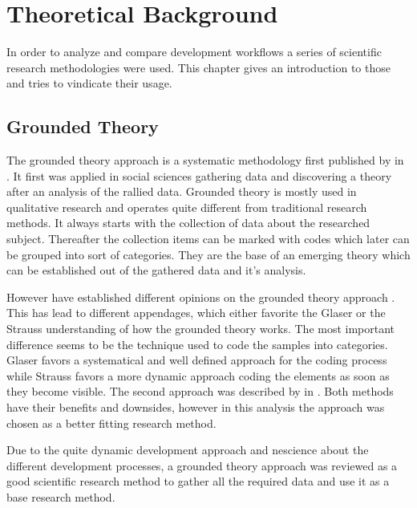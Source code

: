 \chapter{Theoretical Background} %
\label{cha:Theoretical Background}

In order to analyze and compare development workflows a series of scientific
research methodologies were used. This chapter gives an introduction to those
and tries to vindicate their usage.

\section{Grounded Theory} %
\label{sec:Grounded Theory}

The grounded theory approach is a systematic methodology first published by
\textcite{Glaser1967} in \citeyear{Glaser1967}. It first was applied in social
sciences gathering data and discovering a theory after an analysis of the
rallied data. Grounded theory is mostly used in qualitative research and
operates quite different from traditional research methods. It always starts
with the collection of data about the researched subject. Thereafter the
collection items can be marked with codes which later can be grouped into sort
of categories. They are the base of an emerging theory which can be established
out of the gathered data and it's analysis.

However \citeauthor{Glaser1967} have established different opinions on the
grounded theory approach \cite{Heath2004}. This has lead to different
appendages, which either favorite the Glaser or the Strauss understanding of
how the grounded theory works. The most important difference seems to be the
technique used to code the samples into categories. Glaser favors a
systematical and well defined approach for the coding process while Strauss
favors a more dynamic approach coding the elements as soon as they become
visible. The second approach was described by \textcite{Strauss1990} in
\citeyear{Strauss1990}. Both methods have their benefits and downsides, however
in this analysis the \citeauthor{Strauss1990} approach was chosen as a better
fitting research method.

Due to the quite dynamic development approach and nescience about the different
development processes, a grounded theory approach was reviewed as a good
scientific research method to gather all the required data and use it as a base
research method.


